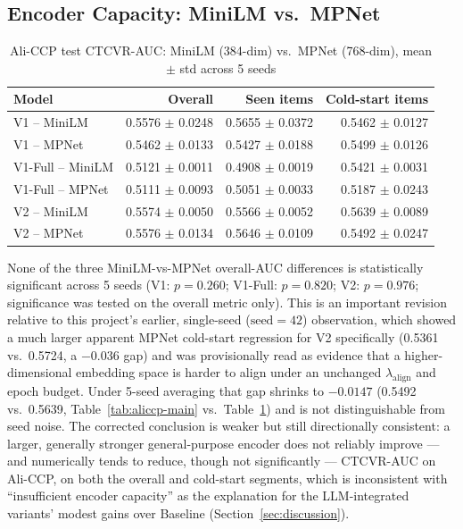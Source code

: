 \subsection{Encoder Capacity: MiniLM vs.\ MPNet}
\label{sec:results-encoders}

\begin{table}[h]
\centering
\caption{Ali-CCP test CTCVR-AUC: MiniLM (384-dim) vs.\ MPNet (768-dim), mean $\pm$ std across 5 seeds}
\label{tab:mpnet-vs-minilm}
\begin{tabular}{lrrr}
\toprule
Model & Overall & Seen items & Cold-start items \\
\midrule
V1 -- MiniLM      & 0.5576 $\pm$ 0.0248 & 0.5655 $\pm$ 0.0372 & 0.5462 $\pm$ 0.0127 \\
V1 -- MPNet       & 0.5462 $\pm$ 0.0133 & 0.5427 $\pm$ 0.0188 & 0.5499 $\pm$ 0.0126 \\
V1-Full -- MiniLM & 0.5121 $\pm$ 0.0011 & 0.4908 $\pm$ 0.0019 & 0.5421 $\pm$ 0.0031 \\
V1-Full -- MPNet  & 0.5111 $\pm$ 0.0093 & 0.5051 $\pm$ 0.0033 & 0.5187 $\pm$ 0.0243 \\
V2 -- MiniLM      & 0.5574 $\pm$ 0.0050 & 0.5566 $\pm$ 0.0052 & 0.5639 $\pm$ 0.0089 \\
V2 -- MPNet       & 0.5576 $\pm$ 0.0134 & 0.5646 $\pm$ 0.0109 & 0.5492 $\pm$ 0.0247 \\
\bottomrule
\end{tabular}
\end{table}

None of the three MiniLM-vs-MPNet overall-AUC differences is statistically significant across 5 seeds (V1: $p=0.260$; V1-Full: $p=0.820$; V2: $p=0.976$; significance was tested on the overall metric only). This is an important revision relative to this project's earlier, single-seed ($\text{seed}=42$) observation, which showed a much larger apparent MPNet cold-start regression for V2 specifically (0.5361 vs.\ 0.5724, a $-0.036$ gap) and was provisionally read as evidence that a higher-dimensional embedding space is harder to align under an unchanged $\lambda_{\text{align}}$ and epoch budget. Under 5-seed averaging that gap shrinks to $-0.0147$ (0.5492 vs.\ 0.5639, Table~\ref{tab:aliccp-main} vs.\ Table~\ref{tab:mpnet-vs-minilm}) and is not distinguishable from seed noise. The corrected conclusion is weaker but still directionally consistent: a larger, generally stronger general-purpose encoder does not reliably improve --- and numerically tends to reduce, though not significantly --- CTCVR-AUC on Ali-CCP, on both the overall and cold-start segments, which is inconsistent with ``insufficient encoder capacity'' as the explanation for the LLM-integrated variants' modest gains over Baseline (Section~\ref{sec:discussion}).

